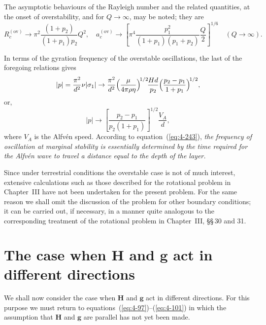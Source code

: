 The asymptotic behaviours of the Rayleigh number and the related quantities, at the onset of overstability, and for $Q\to\infty$, may be noted; they are
\begin{equation}
\label{eq:4-241}
R_c^{(\text{ov})} \to \pi^2\frac{(1+p_2)}{(1+p_1)p_2}Q^2, \quad a_c^{(\text{ov})} \to \left[\pi^4\frac{p_1^2}{(1+p_1)(p_1+p_2)}\frac{Q}{2}\right]^{1/6} \quad (Q\to\infty).
\end{equation}

In terms of the gyration frequency of the overstable oscillations, the last of the foregoing relations gives
\begin{equation}
\label{eq:4-242}
|p| = \frac{\pi^2}{d^2}\nu|\sigma_1| \to \frac{\pi^2}{d^2}\Bigl(\frac{\mu}{4\pi\rho\eta}\Bigr)^{\!1/2}\!\frac{Hd}{p_2}\Bigl(\frac{p_2-p_1}{1+p_1}\Bigr)^{\!1/2},
\end{equation}
or,
\begin{equation}
\label{eq:4-243}
|p| \to \left[\frac{p_2-p_1}{p_2(1+p_1)}\right]^{1/2}\frac{V_A}{d},
\end{equation}
where $V_A$ is the Alfv\'en speed. According to equation~(\ref{eq:4-243}), \emph{the frequency of oscillation at marginal stability is essentially determined by the time required for the Alfv\'en wave to travel a distance equal to the depth of the layer.}

Since under terrestrial conditions the overstable case is not of much interest, extensive calculations such as those described for the rotational problem in Chapter~III have not been undertaken for the present problem. For the same reason we shall omit the discussion of the problem for other boundary conditions; it can be carried out, if necessary, in a manner quite analogous to the corresponding treatment of the rotational problem in Chapter~III, \S\S\,30 and 31.

\section{The case when $\mathbf{H}$ and $\mathbf{g}$ act in different directions}\label{sec:47}

We shall now consider the case when $\mathbf{H}$ and $\mathbf{g}$ act in different directions. For this purpose we must return to equations~(\ref{eq:4-97})--(\ref{eq:4-101}) in which the assumption that $\mathbf{H}$ and $\mathbf{g}$ are parallel has not yet been made.

